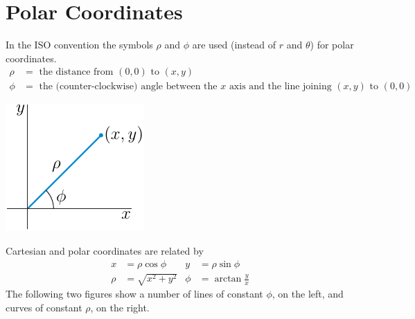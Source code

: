\section{Polar Coordinates}\label{ap:ISOpolar}
In the ISO convention the symbols $\rho$ and $\phi$ are used 
(instead of $r$ and $\theta$) for polar coordinates.
\begin{align*}
\rho&=\text{ the distance from }(0,0)\text{ to }(x,y)\\
\phi&=\text{ the (counter-clockwise) angle between the $x$ axis 
               and the line joining $(x,y)$ to $(0,0)$}
\end{align*}
\begin{efig}
\begin{center}
    \includegraphics{polar.pdf}
\end{center}
\end{efig}
Cartesian and polar coordinates are related by
\begin{align*}
x&=\rho\cos\phi &
y&=\rho\sin\phi  \\
    \rho&=\sqrt{x^2+y^2} &
    \phi&=\arctan\frac{y}{x}
\end{align*}
The following two figures show a number of lines of constant $\phi$,
on the left, and curves of constant $\rho$, on the right.
